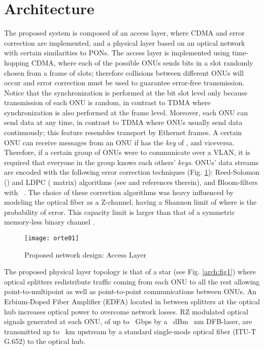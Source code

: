 \documentclass[10pt]{article}
\begin{document}
\section{Architecture}
The proposed system is composed of an access layer, where CDMA and error correction are implemented, and a physical layer based on an optical network with certain similarities to PONs. 
The access layer is implemented using time-hopping CDMA, where each of the  possible ONUs sends bits in a slot randomly chosen from a frame of  slots; therefore
collisions between different ONUs will occur and error correction must be used to guarantee error-free transmission. 
Notice that the synchronization is performed at the bit slot level only
because transmission of each ONU is random, in contrast to TDMA where
synchronization is also performed at the frame level. 
Moreover, each ONU can send data at any time, in contrast to TDMA where
ONUs usually send data continuously; this feature resembles transport by Ethernet frames.
A certain ONU  can receive messages from an ONU  if  has the
{\em key} of , and viceversa. Therefore, if a certain group of ONUs
were to communicate over a VLAN, it is required that everyone in the group
knows each others' {\em keys}.
ONUs' data streams are encoded with the following error correction techniques (Fig. \ref{arch:chain}):
 Reed-Solomon () and LDPC ( matrix) algorithms (see \cite{Moon:05} and references therein), and Bloom-filters with ~\cite{Bloom70space/timetrade-offs}.
The choice of these correction algorithms was heavy influenced by
modeling the optical fiber as a Z-channel, having a Shannon limit of  where  is the probability of error. 
This capacity limit is larger than that of a symmetric memory-less binary channel \cite{Tallini:02}.
\begin{figure}[!t]
  \centering
    \texttt{[image: orte01]}
    \caption{Proposed network design: Access Layer}
    \label{arch:chain}
\end{figure}

The proposed physical layer topology is that of a star (see Fig.
\ref{arch:fig1}) where optical splitters redistribute traffic coming
from each ONU to all the rest allowing point-to-multipoint as well as
point-to-point communications between  ONUs.
An Erbium-Doped Fiber Amplifier (EDFA) located in between splitters at
the optical hub increases optical power to overcome network losses.  RZ
modulated optical signals generated at each ONU, of up to ~Gbps by a
~dBm ~nm DFB-laser, are transmitted up to ~km upstream by a
standard single-mode optical fiber (ITU-T G.652) to the optical hub.
\end{document}
